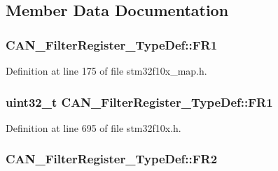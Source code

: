 \subsection{Member Data Documentation}
\subsubsection[{\texorpdfstring{F\+R1}{FR1}}]{ C\+A\+N\+\_\+\+Filter\+Register\+\_\+\+Type\+Def\+::\+F\+R1}\hypertarget{struct_c_a_n___filter_register___type_def_a3d54787d8329760446586ad21da29667}{}\label{struct_c_a_n___filter_register___type_def_a3d54787d8329760446586ad21da29667}


Definition at line 175 of file stm32f10x\+\_\+map.\+h.

\subsubsection[{\texorpdfstring{F\+R1}{FR1}}]{ {\bf uint32\+\_\+t} C\+A\+N\+\_\+\+Filter\+Register\+\_\+\+Type\+Def\+::\+F\+R1}\hypertarget{struct_c_a_n___filter_register___type_def_ac9bc1e42212239d6830582bf0c696fc5}{}\label{struct_c_a_n___filter_register___type_def_ac9bc1e42212239d6830582bf0c696fc5}


Definition at line 695 of file stm32f10x.\+h.

\subsubsection[{\texorpdfstring{F\+R2}{FR2}}]{ C\+A\+N\+\_\+\+Filter\+Register\+\_\+\+Type\+Def\+::\+F\+R2}\hypertarget{struct_c_a_n___filter_register___type_def_a028ebea46be9809d8e350efcb4a686bc}{}\label{struct_c_a_n___filter_register___type_def_a028ebea46be9809d8e350efcb4a686bc}


